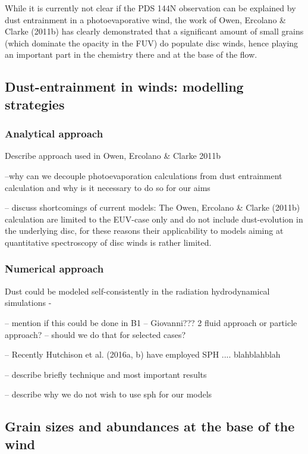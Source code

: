\documentclass[10pt,fleqn,twoside]{article}
\begin{document}
While it is currently not clear if the PDS 144N observation can be
explained by dust entrainment in a photoevaporative wind, the work of
Owen, Ercolano \& Clarke (2011b) has clearly demonstrated that a
significant amount of small grains (which dominate the opacity in the
FUV) do populate disc winds, hence playing an important part in the
chemistry there and at the base of the flow. 

\subsection{Dust-entrainment in winds: modelling strategies}

\subsubsection{Analytical approach}

{\color{red}Describe approach used in Owen, Ercolano \& Clarke 2011b

--why can we decouple photoevaporation calculations from dust
entrainment calculation and why is it necessary to do so for our aims

-- discuss shortcomings of current models: The Owen, Ercolano \& Clarke (2011b) calculation are limited to the EUV-case
only and do not include dust-evolution in the underlying disc, for
these reasons their applicability to models aiming at quantitative
spectroscopy of disc winds is rather limited. 
}

\subsubsection{Numerical approach}

{\color{red}Dust could be modeled self-consistently in the
  radiation hydrodynamical simulations - 

-- mention if this could be done in B1 -- Giovanni??? 2 fluid approach
or particle approach? -- should we do that for selected cases? 

-- Recently Hutchison et al. (2016a, b) have employed SPH
.... blahblahblah 

-- describe briefly technique and most important results 

-- describe why we do not wish to use sph for our models 

}

\subsection{Grain sizes and abundances at the base of the wind}
\end{document}
